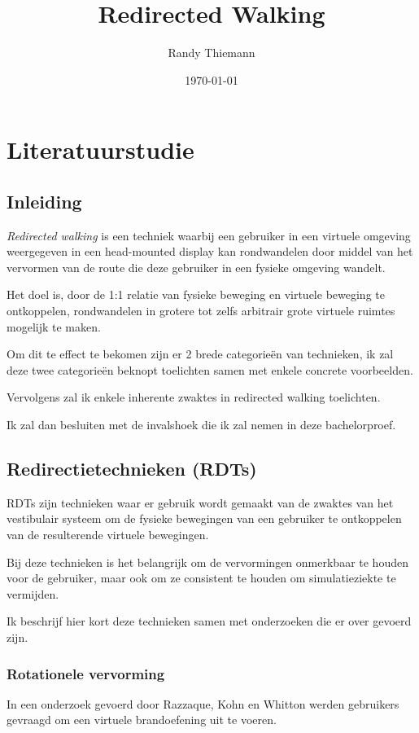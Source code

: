 \documentclass[a4paper,12pt]{article}
\begin{document}
\author{Randy Thiemann} 
\title{Redirected Walking} 
\date{\today} 
\maketitle

\section{Literatuurstudie}
\subsection{Inleiding}
\emph{Redirected walking} is een techniek waarbij een gebruiker in een virtuele
omgeving weergegeven in een head-mounted display kan rondwandelen door middel
van het vervormen van de route die deze gebruiker in een fysieke omgeving wandelt.

Het doel is, door de 1:1 relatie van fysieke beweging en virtuele beweging te
ontkoppelen, rondwandelen in grotere tot zelfs arbitrair grote virtuele ruimtes
mogelijk te maken.

Om dit te effect te bekomen zijn er 2 brede categorie\"en van technieken, ik zal
deze twee categorie\"en beknopt toelichten samen met enkele concrete voorbeelden.

Vervolgens zal ik enkele inherente zwaktes in redirected walking toelichten.

Ik zal dan besluiten met de invalshoek die ik zal nemen in deze bachelorproef.


\subsection{Redirectietechnieken (RDTs)}
RDTs zijn technieken waar er gebruik wordt gemaakt van de zwaktes van het 
vestibulair systeem om de fysieke bewegingen van een gebruiker te ontkoppelen
van de resulterende virtuele bewegingen.

Bij deze technieken is het belangrijk om de vervormingen onmerkbaar te houden
voor de gebruiker, maar ook om ze consistent te houden om simulatieziekte te
vermijden.\cite{kohn01}

Ik beschrijf hier kort deze technieken samen met onderzoeken die er over gevoerd
zijn.


\subsubsection{Rotationele vervorming}
In een onderzoek gevoerd door Razzaque, Kohn en Whitton\cite{kohn01} werden 
gebruikers gevraagd om een virtuele brandoefening uit te voeren.
\end{document}
